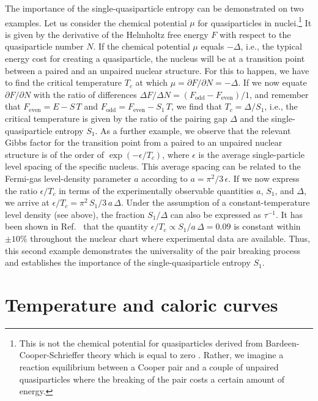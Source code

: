 \documentclass[sort&compress,final,numberedheadings]{aipproc}
\begin{document}
The importance of the single-quasiparticle entropy can be demonstrated on two 
examples. Let us consider the chemical potential $\mu$ for quasiparticles in 
nuclei.\footnote{This is not the chemical potential for quasiparticles derived 
from Bardeen-Cooper-Schrieffer theory which is equal to zero 
\protect\cite{Mo75}. Rather, we imagine a reaction equilibrium between a Cooper
pair and a couple of unpaired quasiparticles where the breaking of the pair 
costs a certain amount of energy.} It is given by the derivative of the 
Helmholtz free energy $F$ with respect to the quasiparticle number $N$. If the 
chemical potential $\mu$ equals $-\Delta$, i.e., the typical energy cost for 
creating a quasiparticle, the nucleus will be at a transition point between a 
paired and an unpaired nuclear structure. For this to happen, we have to find 
the critical temperature $T_c$ at which $\mu=\partial F/\partial N=-\Delta$. If
we now equate $\partial F/\partial N$ with the ratio of differences 
$\Delta F/\Delta N=(F_{\mathrm{odd}}-F_{\mathrm{even}})/1$, and remember that 
$F_{\mathrm{even}}=E-S\,T$ and $F_{\mathrm{odd}}=F_{\mathrm{even}}-S_1\,T$, we 
find that $T_c=\Delta/S_1$, i.e., the critical temperature is given by the 
ratio of the pairing gap $\Delta$ and the single-quasiparticle entropy $S_1$. 
As a further example, we observe that the relevant Gibbs factor for the 
transition point from a paired to an unpaired nuclear structure is of the order
of $\exp(-\epsilon/T_c)$, where $\epsilon$ is the average single-particle level
spacing of the specific nucleus. This average spacing can be related to the 
Fermi-gas level-density parameter $a$ according to $a=\pi^2/3\,\epsilon$. If we
now express the ratio $\epsilon/T_c$ in terms of the experimentally observable 
quantities $a$, $S_1$, and $\Delta$, we arrive at 
$\epsilon/T_c=\pi^2\,S_1/3\,a\,\Delta$. Under the assumption of a 
constant-temperature level density (see above), the fraction $S_1/\Delta$ can 
also be expressed as $\tau^{-1}$. It has been shown in Ref.\ \cite{GH01} that 
the quantity $\epsilon/T_c\propto S_1/a\,\Delta=0.09$ is constant within 
$\pm 10$\% throughout the nuclear chart where experimental data are available. 
Thus, this second example demonstrates the universality of the pair breaking 
process and establishes the importance of the single-quasiparticle entropy 
$S_1$.

\section{Temperature and caloric curves}
\label{sect:temp}
\end{document}
